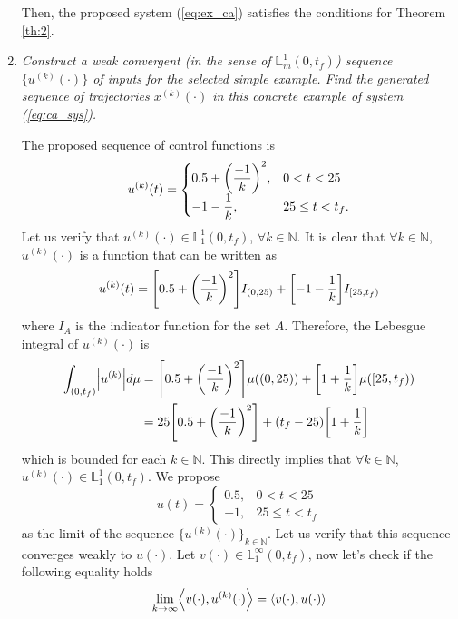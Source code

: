 \documentclass[11pt,letterpaper]{article}
\newcommand{\NN}{{\mathbb{N}}}
\newcommand{\LL}{{\mathbb{L}}}
\let\originalleft\left
\let\originalright\right
\renewcommand{\left}{\mathopen{}\mathclose\bgroup\originalleft}
\renewcommand{\right}{\aftergroup\egroup\originalright}
\theoremstyle{definition}
\begin{document}
\begin{enumerate}[label=\alph*)]
    Then, the proposed system (\ref{eq:ex_ca}) satisfies the conditions for Theorem \ref{th:2}.
    
    
    
    \item \textit{Construct a weak convergent (in the sense of $\LL^1_m(0,t_f)$) sequence $\{u^{(k)}(\cdot)\}$ of inputs for the selected simple example. Find the generated sequence of trajectories $x^{(k)}(\cdot)$ in this concrete example of system (\ref{eq:ca_sys}).}
    
    The proposed sequence of control functions is
    \begin{equation}
        u^{(k)}(t)=\begin{cases}
        0.5+\left(\dfrac{-1}{k}\right)^2, & 0< t<25\\
        -1-\dfrac{1}{k}, & 25\leq t< t_f.
        \end{cases}
    \end{equation}
    Let us verify that $u^{(k)}(\cdot)\in\LL_1^1(0,t_f)$, $\forall k\in \NN$. It is clear that $\forall k\in\NN$, $u^{(k)}(\cdot)$ is a function that can be written as 
    \[
    u^{(k)}(t)=\left[0.5+\left(\dfrac{-1}{k}\right)^2\right]I_{(0,25)} + \left[-1-\dfrac{1}{k}\right]I_{[25,t_f)}
    \]
    where $I_A$ is the indicator function for the set $A$. Therefore, the Lebesgue integral of $u^{(k)}(\cdot)$ is
    \[
    \begin{split}
        \int_{(0,t_f)}\left|u^{(k)}\right|d\mu&=\left[0.5+\left(\dfrac{-1}{k}\right)^2\right]\mu((0,25)) + \left[1+\dfrac{1}{k}\right]\mu([25,t_f))\\
        &=25\left[0.5+\left(\dfrac{-1}{k}\right)^2\right]+(t_f-25)\left[1+\dfrac{1}{k}\right]
    \end{split}
    \]
    which is bounded for each $k\in\NN$. This directly implies that $\forall k\in\NN$, $u^{(k)}(\cdot)\in\LL_1^1(0,t_f)$. We propose 
    \[
    u(t)=\begin{cases}
    0.5,&0<t<25\\
    -1,&25\leq t<t_f
    \end{cases}
    \]
    as the limit of the sequence $\{u^{(k)}(\cdot)\}_{k\in\NN}$. Let us verify that this sequence converges weakly to $u(\cdot)$. Let $v(\cdot)\in\LL_1^\infty(0,t_f)$, now let's check if the following equality holds
    \[
    \begin{split}
    \lim_{k\rightarrow\infty}\left\langle v(\cdot),u^{(k)}(\cdot)\right\rangle&=\left\langle v(\cdot),u(\cdot)\right\rangle\\

\end{split}\]
\end{enumerate}
\end{document}
